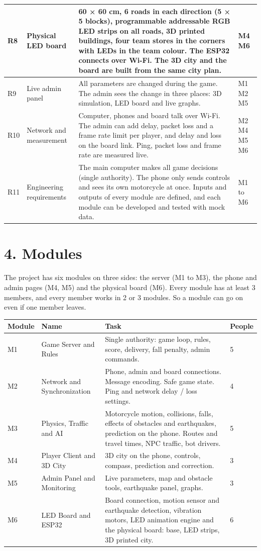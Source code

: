 \documentclass[
  english,
  10pt,
  a4paper,
]{article}
\newcommand{\ckkeep}[1]{\par\noindent\begin{minipage}{\linewidth}\setlength{\parskip}{4pt}#1\end{minipage}\par\smallskip}
\begin{document}
{\begin{tabular}{|L{0.05}|L{0.16}|L{0.63}|L{0.16}|}
R8 & Physical LED board & 60 × 60 cm, 6 roads in each direction (5 × 5 blocks), programmable addressable RGB LED strips on all roads, 3D printed buildings, four team stores in the corners with LEDs in the team colour. The ESP32 connects over Wi-Fi. The 3D city and the board are built from the same city plan. & M4 M6 \\ \hline
R9 & Live admin panel & All parameters are changed during the game. The admin sees the change in three places: 3D simulation, LED board and live graphs. & M1 M2 M5 \\ \hline
R10 & Network and measurement & Computer, phones and board talk over Wi-Fi. The admin can add delay, packet loss and a frame rate limit per player, and delay and loss on the board link. Ping, packet loss and frame rate are measured live. & M2 M4 M5 M6 \\ \hline
R11 & Engineering requirements & The main computer makes all game decisions (single authority). The phone only sends controls and sees its own motorcycle at once. Inputs and outputs of every module are defined, and each module can be developed and tested with mock data. & M1 to M6 \\ \hline
\end{tabular}}

\section{4. Modules}

\ckkeep{%
The project has six modules on three sides: the server (M1 to M3), the phone and admin pages (M4,
M5) and the physical board (M6). Every module has at least 3 members, and every member works in 2 or
3 modules. So a module can go on even if one member leaves.

\begin{tabular}{|L{0.10}|L{0.27}|L{0.54}|L{0.09}|}
\hline \textbf{Module} & \textbf{Name} & \textbf{Task} & \textbf{People} \\ \hline 
M1 & Game Server and Rules & Single authority: game loop, rules, score, delivery, fall penalty, admin commands. & 5 \\ \hline
M2 & Network and Synchronization & Phone, admin and board connections. Message encoding. Safe game state. Ping and network delay / loss settings. & 4 \\ \hline
M3 & Physics, Traffic and AI & Motorcycle motion, collisions, falls, effects of obstacles and earthquakes, prediction on the phone. Routes and travel times, NPC traffic, bot drivers. & 5 \\ \hline
M4 & Player Client and 3D City & 3D city on the phone, controls, compass, prediction and correction. & 3 \\ \hline
M5 & Admin Panel and Monitoring & Live parameters, map and obstacle tools, earthquake panel, graphs. & 3 \\ \hline
M6 & LED Board and ESP32 & Board connection, motion sensor and earthquake detection, vibration motors, LED animation engine and the physical board: base, LED strips, 3D printed city. & 6 \\ \hline
\end{tabular}}
\end{document}
